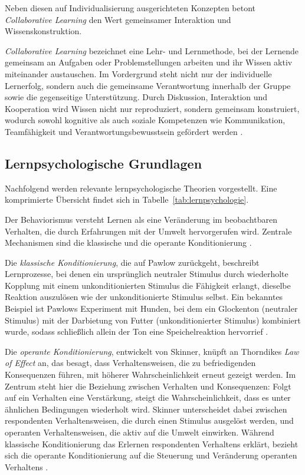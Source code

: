 Neben diesen auf Individualisierung ausgerichteten Konzepten betont \textit{Collaborative Learning} den Wert gemeinsamer Interaktion und Wissenskonstruktion.

\textit{Collaborative Learning} bezeichnet eine Lehr- und Lernmethode, bei der Lernende gemeinsam an Aufgaben oder Problemstellungen arbeiten und ihr Wissen aktiv miteinander austauschen. Im Vordergrund steht nicht nur der individuelle Lernerfolg, sondern auch die gemeinsame Verantwortung innerhalb der Gruppe sowie die gegenseitige Unterstützung. Durch Diskussion, Interaktion und Kooperation wird Wissen nicht nur reproduziert, sondern gemeinsam konstruiert, wodurch sowohl kognitive als auch soziale Kompetenzen wie Kommunikation, Teamfähigkeit und Verantwortungsbewusstsein gefördert werden \parencite[S.~486]{laal_benefits_2021}.
\fi

\subsection{Lernpsychologische Grundlagen}\label{chap:3-1-psychology}

Nachfolgend werden relevante lernpsychologische Theorien vorgestellt. Eine komprimierte Übersicht findet sich in Tabelle~\ref{tab:lernpsychologie}.

Der Behaviorismus versteht Lernen als eine Veränderung im beobachtbaren Verhalten, die durch Erfahrungen mit der Umwelt hervorgerufen wird. Zentrale Mechanismen sind die klassische und die operante Konditionierung \parencite[S.~15]{pfeiffer_simulationsumgebungen_2008}.

Die \textit{klassische Konditionierung}, die auf Pawlow zurückgeht, beschreibt Lernprozesse, bei denen ein ursprünglich neutraler Stimulus durch wiederholte Kopplung mit einem unkonditionierten Stimulus die Fähigkeit erlangt, dieselbe Reaktion auszulösen wie der unkonditionierte Stimulus selbst. Ein bekanntes Beispiel ist Pawlows Experiment mit Hunden, bei dem ein Glockenton (neutraler Stimulus) mit der Darbietung von Futter (unkonditionierter Stimulus) kombiniert wurde, sodass schließlich allein der Ton eine Speichelreaktion hervorrief \parencite[S.~7ff]{furstenau_lehr-lern-theorien_2019}.

Die \textit{operante Konditionierung}, entwickelt von Skinner, knüpft an Thorndikes \textit{Law of Effect} an, das besagt, dass Verhaltensweisen, die zu befriedigenden Konsequenzen führen, mit höherer Wahrscheinlichkeit erneut gezeigt werden. Im Zentrum steht hier die Beziehung zwischen Verhalten und Konsequenzen: Folgt auf ein Verhalten eine Verstärkung, steigt die Wahrscheinlichkeit, dass es unter ähnlichen Bedingungen wiederholt wird. Skinner unterscheidet dabei zwischen respondenten Verhaltensweisen, die durch einen Stimulus ausgelöst werden, und operanten Verhaltensweisen, die aktiv auf die Umwelt einwirken. Während klassische Konditionierung das Erlernen respondenten Verhaltens erklärt, bezieht sich die operante Konditionierung auf die Steuerung und Veränderung operanten Verhaltens \parencite[S.~15ff]{furstenau_lehr-lern-theorien_2019}.

